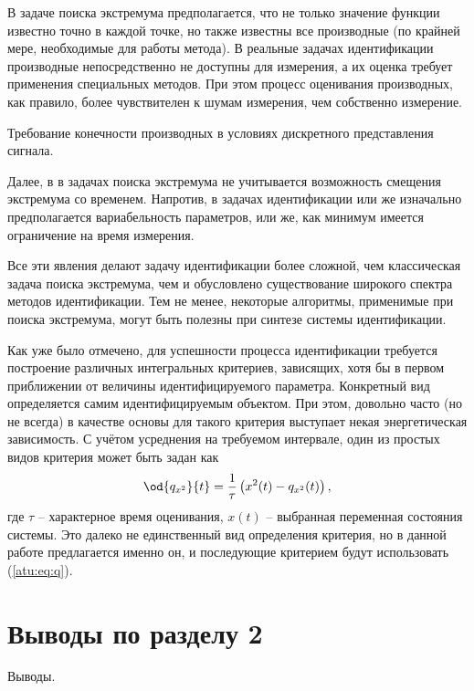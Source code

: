 В задаче поиска экстремума предполагается, что не только
значение функции известно точно в каждой точке, но также известны все производные
(по крайней мере, необходимые для работы метода).
В реальные задачах идентификации производные непосредственно
не доступны для измерения, а их оценка требует применения специальных
методов. При этом процесс оценивания производных, как правило,
более чувствителен к шумам измерения, чем собственно измерение.

Требование конечности производных в условиях дискретного представления сигнала.

Далее, в в задачах поиска экстремума не учитывается возможность
смещения экстремума со временем. Напротив, в задачах идентификации
или же изначально предполагается вариабельность параметров, или же,
как минимум имеется ограничение на время измерения.


Все эти явления делают задачу идентификации более сложной, чем
классическая задача поиска экстремума, чем и обусловлено
существование широкого спектра методов идентификации. Тем не менее,
некоторые алгоритмы, применимые при поиска экстремума, могут быть
полезны при синтезе системы идентификации.

Как уже было отмечено, для успешности процесса идентификации требуется
построение различных интегральных критериев, зависящих,
хотя бы в первом приближении
от величины идентифицируемого параметра. Конкретный вид определяется самим идентифицируемым
объектом. При этом, довольно часто (но не всегда) в качестве основы для такого критерия выступает
некая энергетическая зависимость. С учётом усреднения на требуемом интервале,
один из простых видов критерия может быть задан как
%
\begin{equation}
\od{q_{x^2}}{t}
=
\frac{1}{\tau} \left( x^2(t) - q_{x^2}(t) \right)
,
\label{atu:eq:q}
\end{equation}
%
где $\tau$ -- характерное время оценивания, $x(t)$ -- выбранная переменная состояния системы.
Это далеко не единственный вид определения критерия, но в данной работе предлагается именно он,
и последующие критерием будут использовать (\ref{atu:eq:q}).

\section{Выводы по разделу 2}

Выводы.

